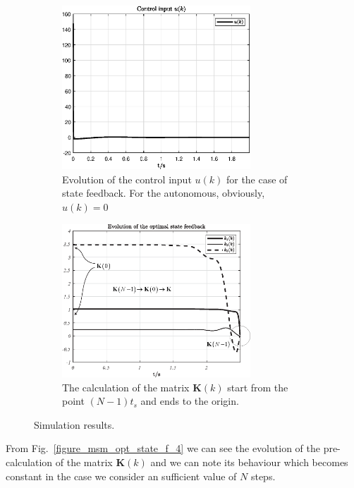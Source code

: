 \documentclass[11pt,a4paper,oneside]{book}
\numberwithin{equation}{section}
\theoremstyle{it}
\theoremstyle{definition}
\begin{document}
\begin{figure}[H]
	\centering
	\begin{subfigure}{.5\textwidth}
		\centering
		\includegraphics[width = 200pt, 
		keepaspectratio]{figures/optimal_control/control_input2.eps}
		\captionsetup{width=0.65\textwidth, font=footnotesize}
		\caption{Evolution of the control input $u(k)$ for the case of state 
			feedback. For the autonomous, obviously, $u(k)=0$}
		\label{figure_control_input}
	\end{subfigure}%
	\begin{subfigure}{.5\textwidth}
		\centering
		\includegraphics[width = 200pt, 
		keepaspectratio]{figures/optimal_control/feedback_m_com.eps}
		\captionsetup{width=0.65\textwidth, font=footnotesize}
		\caption{The calculation of the matrix $\mathbf{K}(k)$ start from the 
			point $(N-1)t_s$ and ends to the origin.}
		\label{figure_kevo}
	\end{subfigure}
	\captionsetup{width=0.5\textwidth, font=small}
	\caption{Simulation results.}
	\label{}
\end{figure}
From Fig.~\ref{figure_msm_opt_state_f_4} we can see the evolution of the 
pre-calculation of the matrix $\mathbf{K}(k)$ and we can note its behaviour 
which becomes constant in the case we consider 
an sufficient value of $N$ steps.
\end{document}
